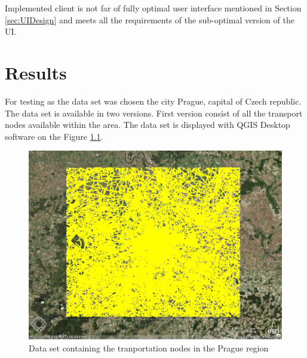 \documentclass[thesis=M,english]{FITthesis}[2012/10/20]
\begin{document}
Implemented client is not far of fully optimal user interface mentioned in Section \ref{sec:UIDesign} and meets all the requirements of the sub-optimal version of the UI. 


\chapter{Results}
\label{ch:Results}

For testing as the data set was chosen the city Prague, capital of Czech republic. The data set is available in two versions. First version consist of all the transport nodes available within the area. 
The data set is displayed with QGIS Desktop software on the Figure \ref{pic:dataset1}.
\begin{figure}[H]
\centering
\includegraphics[width=1\textwidth]{pics/praguedatasetL}
\caption{Data set containing the tranportation nodes in the Prague region}
\label{pic:dataset1}
\end{figure}
\end{document}
